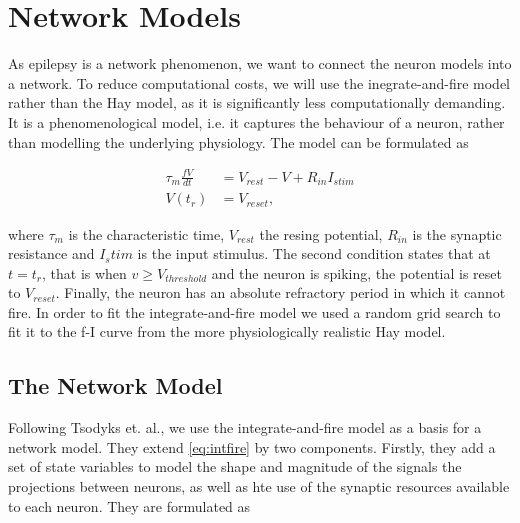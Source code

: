 \section{Network Models}


As epilepsy is a network phenomenon, we want to connect the neuron models into a network. To reduce
computational costs, we will use the inegrate-and-fire model rather than the Hay model, as it is
significantly less computationally demanding. It is a phenomenological model, i.e. it captures the
behaviour of a neuron, rather than modelling the underlying physiology. The model can be formulated
as

\begin{align} \label{eq:intfire}
    \tau_m \frac{fV}{dt} &= V_{rest} - V + R_{in}I_{stim} \\
    V(t_r) &= V_{reset},
\end{align}

where \(\tau_m\) is the characteristic time, \(V_{rest}\) the resing potential, \(R_{in}\) is the
synaptic resistance and \(I_stim\) is the input stimulus. The second condition states that at 
\(t = t_r\), that is when \(v \geq V_{threshold}\) and the neuron is spiking, the potential is reset
to \(V_{reset}\). Finally, the neuron has an absolute refractory period in which it cannot fire. In
order to fit the integrate-and-fire model we used a random grid search to fit it to the f-I curve
from the more physiologically realistic Hay model.

\subsection{The Network Model}
Following Tsodyks et. al., we use the integrate-and-fire model as a basis for a network model. They
extend \cref{eq:intfire} by two components. Firstly, they add a set of state variables to model the
shape and magnitude of the signals the projections between neurons, as well as hte use of the
synaptic resources available to each neuron. They are formulated as

